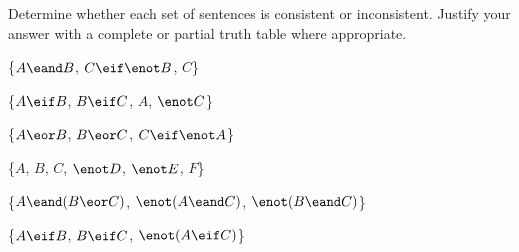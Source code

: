 \noindent\problempart
\label{pr.TT.consistent}
Determine whether each set of sentences is consistent or inconsistent. Justify your answer with a complete or partial truth table where appropriate.
\begin{exercises}
\item \{$A \eand B$, $C\eif \enot B$, $C$\} \vspace{.5ex}%
\item \{$A\eif B$, $B\eif C$, $A$, $\enot C$\}\vspace{.5ex} %
\item \{$A \eor B$, $B\eor C$, $C\eif \enot A$\}\vspace{.5ex} %
\item \{$A$, $B$, $C$, $\enot D$, $\enot E$, $F$\}\vspace{.5ex} %
\item \{$A \eand (B \eor C)$, $\enot(A \eand C)$, $\enot(B \eand C)$\} \vspace{.5ex}%
\item \{$A \eif B$, $B \eif C$, $\enot(A \eif C)$\} \vspace{.5ex} %


\end{exercises}


